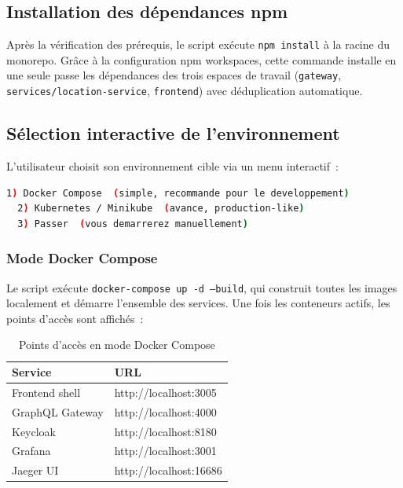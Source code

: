 \documentclass[12pt,a4paper]{article}
\begin{document}
\subsection{Installation des d\'{e}pendances npm}

Apr\`{e}s la v\'{e}rification des pr\'{e}requis, le script ex\'{e}cute \texttt{npm install}
\`{a} la racine du monorepo. Gr\^{a}ce \`{a} la configuration npm workspaces, cette
commande installe en une seule passe les d\'{e}pendances des trois espaces de
travail (\texttt{gateway}, \texttt{services/location-service}, \texttt{frontend})
avec d\'{e}duplication automatique.

\subsection{S\'{e}lection interactive de l'environnement}

L'utilisateur choisit son environnement cible via un menu interactif~:

\begin{lstlisting}[language=bash, caption=Menu de s\'{e}lection de l'environnement]
  1) Docker Compose  (simple, recommande pour le developpement)
  2) Kubernetes / Minikube  (avance, production-like)
  3) Passer  (vous demarrerez manuellement)
\end{lstlisting}

\subsubsection{Mode Docker Compose}

Le script ex\'{e}cute \texttt{docker-compose up -d --build}, qui construit toutes
les images localement et d\'{e}marre l'ensemble des services. Une fois les
conteneurs actifs, les points d'acc\`{e}s sont affich\'{e}s~:

\begin{table}[H]
\centering
\renewcommand{\arraystretch}{1.4}
\begin{tabular}{
  >{\raggedright\arraybackslash}p{4.5cm}
  >{\ttfamily\raggedright\arraybackslash}p{6cm}
}
\toprule
\rowcolor{secondary}
\textbf{Service} & \textbf{URL} \\
\midrule
Frontend shell   & http://localhost:3005 \\
\rowcolor{rowgray}
GraphQL Gateway  & http://localhost:4000 \\
Keycloak         & http://localhost:8180 \\
\rowcolor{rowgray}
Grafana          & http://localhost:3001 \\
Jaeger UI        & http://localhost:16686 \\
\bottomrule
\end{tabular}
\caption{Points d'acc\`{e}s en mode Docker Compose}
\end{table}
\end{document}
